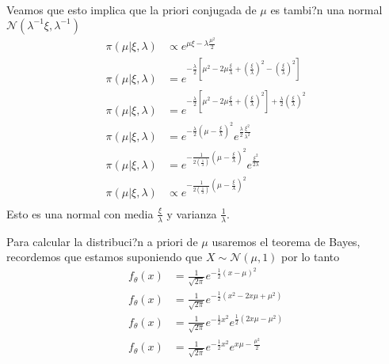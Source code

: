 \documentclass[12pt,]{article}
\begin{document}
Veamos que esto implica que la priori conjugada de \(\mu\) es tambi?n
una normal \(\mathcal{N}(\lambda^{-1}\xi,\lambda^{-1})\) \[
\begin{array}{rl}
\pi(\mu|\xi,\lambda) & \propto  e^{\mu\xi-\lambda\frac{\mu^2}{2}}\\
\pi(\mu|\xi,\lambda) & =  e^{-\frac{\lambda}{2}[\mu^2-2\mu\frac{\xi}{\lambda} +(\frac{\xi}{\lambda})^2- (\frac{\xi}{\lambda})^2]}\\
\pi(\mu|\xi,\lambda) & =  e^{-\frac{\lambda}{2}[\mu^2-2\mu\frac{\xi}{\lambda} +(\frac{\xi}{\lambda})^2] +\frac{\lambda}{2}(\frac{\xi}{\lambda})^2}\\
\pi(\mu|\xi,\lambda) & =  e^{-\frac{\lambda}{2}(\mu-\frac{\xi}{\lambda})^2} e^{\frac{\lambda}{2}\frac{\xi^2}{\lambda^2}}\\
\pi(\mu|\xi,\lambda) & =  e^{-\frac{1}{2(\frac{1}{\lambda})}(\mu-\frac{\xi}{\lambda})^2} e^{\frac{\xi^2}{2\lambda}}\\
\pi(\mu|\xi,\lambda) & \propto  e^{-\frac{1}{2(\frac{1}{\lambda})}(\mu-\frac{\xi}{\lambda})^2} \\
\end{array}
\] Esto es una normal con media \(\frac{\xi}{\lambda}\) y varianza
\(\frac{1}{\lambda}\).

Para calcular la distribuci?n a priori de \(\mu\) usaremos el teorema de
Bayes, recordemos que estamos suponiendo que
\(X\sim \mathcal{N}(\mu,1)\) por lo tanto \[
\begin{array}{rl}
f_\theta(x) & =\frac{1}{\sqrt{2\pi}}e^{-\frac{1}{2}(x-\mu)^2}\\
f_\theta(x) & =\frac{1}{\sqrt{2\pi}}e^{-\frac{1}{2}(x^2-2x\mu+\mu^2)}\\
f_\theta(x) & =\frac{1}{\sqrt{2\pi}}e^{-\frac{1}{2}x^2} e^{\frac{1}{2}(2x\mu-\mu^2)}\\
f_\theta(x) & =\frac{1}{\sqrt{2\pi}}e^{-\frac{1}{2}x^2} e^{x\mu-\frac{\mu^2}{2}}\\
\end{array}
\]
\end{document}
